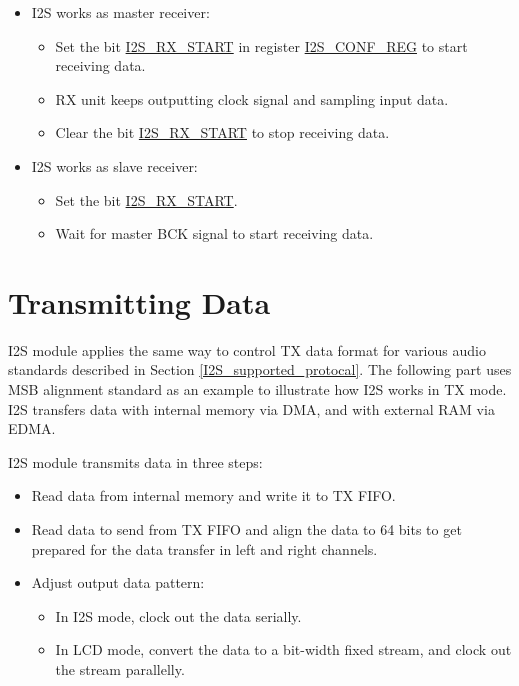 \documentclass[main\_\_EN.tex]{subfiles}
\begin{document}
\begin{itemize}
    \item I2S works as master receiver:
    \begin{itemize}
        \item Set the bit \hyperref[fielddesc:I2SRXSTART]{I2S\_RX\_START} in register \hyperref[regdesc:I2SCONFREG]{I2S\_CONF\_REG} to start receiving data.
        \item RX unit keeps outputting clock signal and sampling input data.
        \item Clear the bit \hyperref[fielddesc:I2SRXSTART]{I2S\_RX\_START} to stop receiving data.
    \end{itemize}
    \item  I2S works as slave receiver:
    \begin{itemize}
        \item Set the bit \hyperref[fielddesc:I2SRXSTART]{I2S\_RX\_START}.
        \item Wait for master BCK signal to start receiving data.
    \end{itemize}
\end{itemize}

\section{Transmitting Data}\label{TXCHAN}

I2S module applies the same way to control TX data format for various audio standards described in Section \ref{I2S_supported_protocal}. The following part uses MSB alignment standard as an example to illustrate how I2S works in TX mode. I2S transfers data with internal memory via DMA, and with external RAM via EDMA.

I2S module transmits data in three steps:

\begin{itemize}
    \item Read data from internal memory and write it to TX FIFO.
    \item Read data to send from TX FIFO and align the data to 64 bits to get prepared for the data transfer in left and right channels.
    \item Adjust output data pattern:
    \begin{itemize}
        \item In I2S mode, clock out the data serially.
        \item In LCD mode, convert the data to a bit-width fixed stream, and clock out the stream parallelly.
    \end{itemize}
\end{itemize}
\end{document}
